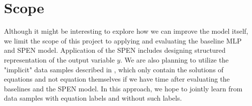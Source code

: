 \documentclass[11pt,letterpaper]{article}
\begin{document}
\section{Scope}
Although it might be interesting to explore how we can improve the model itself, we limit the scope of this project to applying and evaluating the baseline MLP and SPEN model. Application of the SPEN includes designing structured representation of the output variable $y$. We are also planning to utilize the "implicit" data samples described in \cite{UpChChYi16}, which only contain the solutions of equations and not equation themselves if we have time after evaluating the baselines and the SPEN model. In this approach, we hope to jointly learn from data samples with equation labels and without such labels.
\fi
%
\nocite{*}


\end{document}
